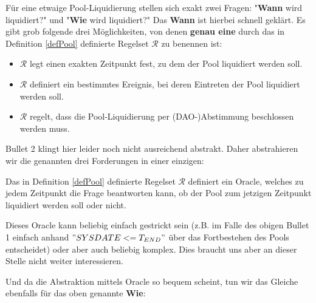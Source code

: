 
Für eine etwaige Pool-Liquidierung stellen sich exakt zwei Fragen: "\textbf{Wann} wird liquidiert?" und "\textbf{Wie} wird liquidiert?" Das \textbf{Wann} ist hierbei schnell geklärt. Es gibt grob folgende drei Möglichkeiten, von denen \textbf{genau eine} durch das in Definition \ref{defPool} definierte Regelset $\mathcal{R}$ zu benennen ist:

\begin{itemize}
  \item $\mathcal{R}$ legt einen exakten Zeitpunkt fest, zu dem der Pool liquidiert werden soll.
  \item $\mathcal{R}$ definiert ein bestimmtes Ereignis, bei deren Eintreten der Pool liquidiert werden soll.
  \item $\mathcal{R}$ regelt, dass die Pool-Liquidierung per (DAO-)Abstimmung beschlossen werden muss.
\end{itemize}

\vspace{0.3cm}

Bullet 2 klingt hier leider noch nicht ausreichend abstrakt. Daher abstrahieren wir die genannten drei Forderungen in einer einzigen:

\vspace{0.2cm}

\begin{Fazit}

Das in Definition \ref{defPool} definierte Regelset $\mathcal{R}$ definiert ein Oracle, welches zu jedem Zeitpunkt die Frage beantworten kann, ob der Pool zum jetzigen Zeitpunkt liquidiert werden soll oder nicht. 

\end{Fazit}
 
\vspace{0.1cm}
 
Dieses Oracle kann beliebig einfach gestrickt sein (z.B. im Falle des obigen Bullet 1 einfach anhand $"SYSDATE <= T_{END}"$ über das Fortbestehen des Pools entscheidet) oder aber auch beliebig komplex. Dies braucht uns aber an dieser Stelle nicht weiter interessieren.

\vspace{0.3cm}

Und da die Abstraktion mittels Oracle so bequem scheint, tun wir das Gleiche ebenfalls für das oben genannte \textbf{Wie}:

\vspace{0.2cm}

